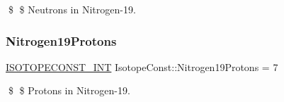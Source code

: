\$ \$ Neutrons in Nitrogen-\/19. \mbox{\label{group___isotope_const-_nitrogen-_n19_gadad4b2244298bca1fc1c558f929168b2}} 
\subsubsection{\texorpdfstring{Nitrogen19\+Protons}{Nitrogen19Protons}}
{\footnotesize\ttfamily \mbox{\hyperlink{group___isotope_const-_macros_ga5f18360b3e99483a35c32d789e62621c}{I\+S\+O\+T\+O\+P\+E\+C\+O\+N\+S\+T\+\_\+\+I\+NT}} Isotope\+Const\+::\+Nitrogen19\+Protons = 7}

\$ \$ Protons in Nitrogen-\/19. 
